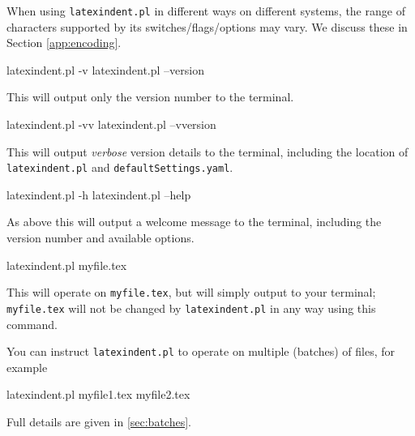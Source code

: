  When using \texttt{latexindent.pl} in different ways on different systems, the range of
 characters supported by its switches/flags/options may vary. We discuss these in Section
 \cref{app:encoding}.


 \begin{commandshell}
latexindent.pl -v
latexindent.pl --version
\end{commandshell}

 This will output only the version number to the terminal.


 \begin{commandshell}
latexindent.pl -vv
latexindent.pl --vversion
\end{commandshell}

 This will output \emph{verbose} version details to the terminal, including the location
 of \texttt{latexindent.pl} and \texttt{defaultSettings.yaml}.


 \begin{commandshell}
latexindent.pl -h
latexindent.pl --help
\end{commandshell}

 As above this will output a welcome message to the terminal, including the version
 number and available options.

 \begin{commandshell}
latexindent.pl myfile.tex
\end{commandshell}

 This will operate on \texttt{myfile.tex}, but will simply output to your terminal;
 \texttt{myfile.tex} will not be changed by \texttt{latexindent.pl} in any way using this
 command.

 You can  instruct
 \texttt{latexindent.pl} to operate on multiple (batches) of files, for example

 \begin{commandshell}
latexindent.pl myfile1.tex myfile2.tex
\end{commandshell}

 Full details are given in \vref{sec:batches}.

